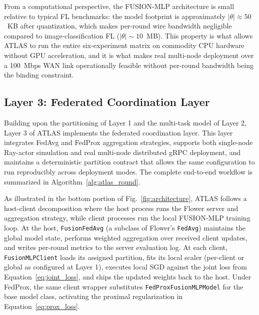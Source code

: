 \documentclass[conference]{IEEEtran}
\begin{document}
From a computational perspective, the FUSION-MLP architecture is small relative to typical FL benchmarks: the model footprint is approximately $|\theta| \approx 50$~KB after quantization, which makes per-round wire bandwidth negligible compared to image-classification FL ($|\theta| \sim 10$~MB). This property is what allows ATLAS to run the entire six-experiment matrix on commodity CPU hardware without GPU acceleration, and it is what makes real multi-node deployment over a 100~Mbps WAN link operationally feasible without per-round bandwidth being the binding constraint.

\subsection{Layer 3: Federated Coordination Layer}
\label{sec:method:fed}

Building upon the partitioning of Layer 1 and the multi-task model of Layer 2, Layer 3 of ATLAS implements the federated coordination layer. This layer integrates FedAvg and FedProx aggregation strategies, supports both single-node Ray-actor simulation and real multi-node distributed gRPC deployment, and maintains a deterministic partition contract that allows the same configuration to run reproducibly across deployment modes. The complete end-to-end workflow is summarized in Algorithm~\ref{alg:atlas_round}.

As illustrated in the bottom portion of Fig.~\ref{fig:architecture}, ATLAS follows a host-client decomposition where the host process runs the Flower server and aggregation strategy, while client processes run the local FUSION-MLP training loop. At the host, \texttt{FusionFedAvg} (a subclass of Flower's \texttt{FedAvg}) maintains the global model state, performs weighted aggregation over received client updates, and writes per-round metrics to the server evaluation log. At each client, \texttt{FusionMLPClient} loads its assigned partition, fits its local scaler (per-client or global as configured at Layer 1), executes local SGD against the joint loss from Equation~\ref{eq:joint_loss}, and ships the updated weights back to the host. Under FedProx, the same client wrapper substitutes \texttt{FedProxFusionMLPModel} for the base model class, activating the proximal regularization in Equation~\ref{eq:prox_loss}.
\end{document}
